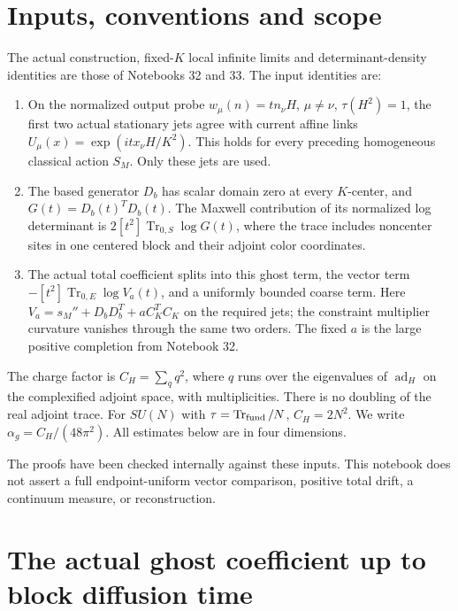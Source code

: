 \documentclass[11pt]{article}
\theoremstyle{remark}
\begin{document}
\section*{Inputs, conventions and scope}

The actual construction, fixed-\(K\) local infinite limits
and determinant-density identities are those of Notebooks
32 and 33. The input identities are:
\begin{enumerate}
\item On the normalized output probe
\(w_\mu(n)=t n_\nu H\), \(\mu\ne\nu\), \(\tau(H^2)=1\),
the first two actual stationary jets agree with current
affine links \(U_\mu(x)=\exp(i t x_\nu H/K^2)\).
This holds for every preceding homogeneous classical
action \(S_M\). Only these jets are used.
\item The based generator \(D_b\) has scalar domain zero
at every \(K\)-center, and \(G(t)=D_b(t)^TD_b(t)\).
The Maxwell contribution of its normalized log determinant
is \(2[t^2]\operatorname{Tr}_{0,S}\log G(t)\), where the
trace includes noncenter sites in one centered block
and their adjoint color coordinates.
\item The actual total coefficient splits into this ghost
term, the vector term
\(-[t^2]\operatorname{Tr}_{0,E}\log V_a(t)\), and a
uniformly bounded coarse term. Here
\(V_a=s_M''+D_bD_b^T+aC_K^TC_K\) on the required jets;
the constraint multiplier curvature vanishes through
the same two orders. The fixed \(a\) is the large
positive completion from Notebook 32.
\end{enumerate}

The charge factor is \(C_H=\sum_q q^2\), where \(q\)
runs over the eigenvalues of \(\operatorname{ad}_H\)
on the complexified adjoint space, with multiplicities.
There is no doubling of the real adjoint trace.
For \(SU(N)\) with \(\tau=\operatorname{Tr}_{\rm fund}/N\),
\(C_H=2N^2\). We write \(\alpha_g=C_H/(48\pi^2)\).
All estimates below are in four dimensions.

The proofs have been checked internally against these
inputs. This notebook does not assert a full
endpoint-uniform vector comparison, positive total
drift, a continuum measure, or reconstruction.



\section{The actual ghost coefficient up to block diffusion time}
\label{pgp-section}
\end{document}
